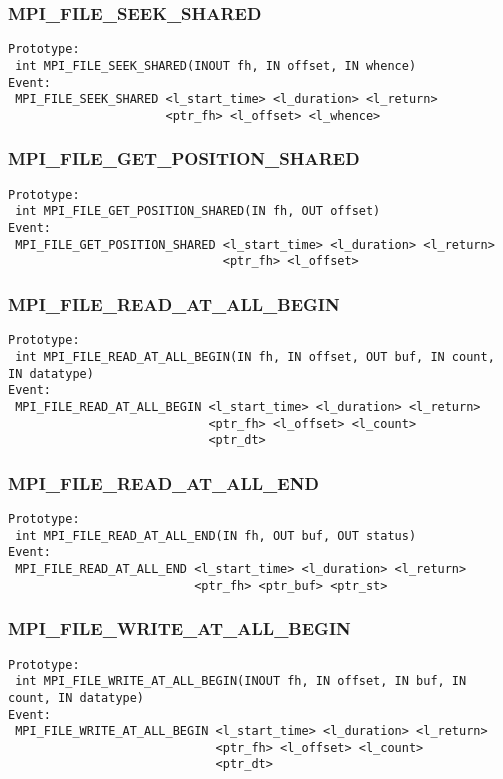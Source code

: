 \documentclass[9pt]{article}
\begin{document}
\subsubsection{MPI\_FILE\_SEEK\_SHARED}
\label{sec:MPIFILESEEKSHARED}
\begin{verbatim}
Prototype:
 int MPI_FILE_SEEK_SHARED(INOUT fh, IN offset, IN whence)
Event:
 MPI_FILE_SEEK_SHARED <l_start_time> <l_duration> <l_return>
                      <ptr_fh> <l_offset> <l_whence>
\end{verbatim}

\subsubsection{MPI\_FILE\_GET\_POSITION\_SHARED}
\label{sec:MPIFILEGETPOSITIONSHARED}
\begin{verbatim}
Prototype:
 int MPI_FILE_GET_POSITION_SHARED(IN fh, OUT offset)
Event:
 MPI_FILE_GET_POSITION_SHARED <l_start_time> <l_duration> <l_return>
                              <ptr_fh> <l_offset>
\end{verbatim}

\subsubsection{MPI\_FILE\_READ\_AT\_ALL\_BEGIN}
\label{sec:MPIFILEREADATALLBEGIN}
\begin{verbatim}
Prototype:
 int MPI_FILE_READ_AT_ALL_BEGIN(IN fh, IN offset, OUT buf, IN count, IN datatype)
Event:
 MPI_FILE_READ_AT_ALL_BEGIN <l_start_time> <l_duration> <l_return>
                            <ptr_fh> <l_offset> <l_count>
                            <ptr_dt>
\end{verbatim}

\subsubsection{MPI\_FILE\_READ\_AT\_ALL\_END}
\label{sec:MPIFILEREADATALLEND}
\begin{verbatim}
Prototype:
 int MPI_FILE_READ_AT_ALL_END(IN fh, OUT buf, OUT status)
Event:
 MPI_FILE_READ_AT_ALL_END <l_start_time> <l_duration> <l_return>
                          <ptr_fh> <ptr_buf> <ptr_st>
\end{verbatim}

\subsubsection{MPI\_FILE\_WRITE\_AT\_ALL\_BEGIN}
\label{sec:MPIFILEWRITEATALLBEGIN}
\begin{verbatim}
Prototype:
 int MPI_FILE_WRITE_AT_ALL_BEGIN(INOUT fh, IN offset, IN buf, IN count, IN datatype)
Event:
 MPI_FILE_WRITE_AT_ALL_BEGIN <l_start_time> <l_duration> <l_return>
                             <ptr_fh> <l_offset> <l_count>
                             <ptr_dt>
\end{verbatim}
\end{document}
